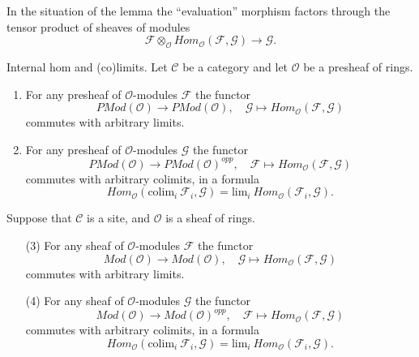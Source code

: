 \noindent
In the situation of the lemma the ``evaluation'' morphism
factors through the tensor product of sheaves of modules
$$
\mathcal{F}
\otimes_\mathcal{O}
\textit{Hom}_{\mathcal{O}}(\mathcal{F}, \mathcal{G})
\longrightarrow
\mathcal{G}.
$$

\begin{lemma}
\label{lemma-internal-hom-commute-limits}
Internal hom and (co)limits.
Let $\mathcal{C}$ be a category and let $\mathcal{O}$ be a presheaf of rings.
\begin{enumerate}
\item For any presheaf of $\mathcal{O}$-modules $\mathcal{F}$ the functor
$$
\textit{PMod}(\mathcal{O}) \longrightarrow \textit{PMod}(\mathcal{O})
,\quad
\mathcal{G} \longmapsto \textit{Hom}_{\mathcal{O}}(\mathcal{F}, \mathcal{G})
$$
commutes with arbitrary limits.
\item For any presheaf of $\mathcal{O}$-modules $\mathcal{G}$ the functor
$$
\textit{PMod}(\mathcal{O}) \longrightarrow \textit{PMod}(\mathcal{O})^{opp}
,\quad
\mathcal{F} \longmapsto \textit{Hom}_{\mathcal{O}}(\mathcal{F}, \mathcal{G})
$$
commutes with arbitrary colimits, in a formula
$$
\textit{Hom}_{\mathcal{O}}(\text{colim}_i\ \mathcal{F}_i, \mathcal{G})
=
\text{lim}_i\ \textit{Hom}_{\mathcal{O}}(\mathcal{F}_i, \mathcal{G}).
$$
\end{enumerate}
Suppose that $\mathcal{C}$ is a site, and $\mathcal{O}$ is a sheaf of rings.
\begin{enumerate}
\item[(3)] For any sheaf of $\mathcal{O}$-modules $\mathcal{F}$ the functor
$$
\textit{Mod}(\mathcal{O}) \longrightarrow \textit{Mod}(\mathcal{O})
,\quad
\mathcal{G} \longmapsto \textit{Hom}_{\mathcal{O}}(\mathcal{F}, \mathcal{G})
$$
commutes with arbitrary limits.
\item[(4)] For any sheaf of $\mathcal{O}$-modules $\mathcal{G}$ the functor
$$
\textit{Mod}(\mathcal{O}) \longrightarrow \textit{Mod}(\mathcal{O})^{opp}
,\quad
\mathcal{F} \longmapsto \textit{Hom}_{\mathcal{O}}(\mathcal{F}, \mathcal{G})
$$
commutes with arbitrary colimits, in a formula
$$
\textit{Hom}_{\mathcal{O}}(\text{colim}_i\ \mathcal{F}_i, \mathcal{G})
=
\text{lim}_i\ \textit{Hom}_{\mathcal{O}}(\mathcal{F}_i, \mathcal{G}).
$$
\end{enumerate}
\end{lemma}

